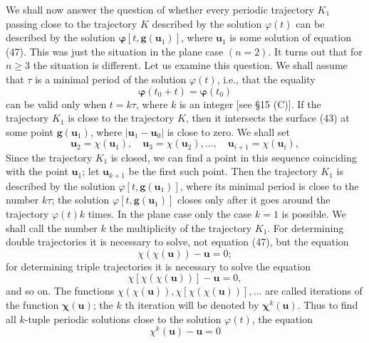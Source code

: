 \documentclass[10pt,a5paper]{book}
\theoremstyle{plain}
\theoremstyle{definition}
\theoremstyle{remark}
\begin{document}
We shall now answer the question of whether every periodic trajectory $K_{1}$ passing close to the trajectory $K$ described by the solution $\varphi(t)$ can be described by the solution $\boldsymbol{\varphi}\left[t, \mathbf{g}\left(\mathbf{u}_{1}\right)\right]$, where $\mathbf{u}_{1}$ is some solution of equation (47). This was just the situation in the plane case $(n=2)$. It turns
out that for $n \geq 3$ the situation is different. Let us examine this question. We shall assume that $\tau$ is a minimal period of the solution $\varphi(t)$, i.e., that the equality
\[
\boldsymbol{\varphi}\left(t_{0}+t\right)=\boldsymbol{\varphi}\left(t_{0}\right)
\]
can be valid only when $t=k \tau$, where $k$ is an integer [see §15 (C)]. If the trajectory $K_{1}$ is close to the trajectory $K$, then it intersects the surface (43) at some point $\mathbf{g}\left(\mathbf{u}_{1}\right)$, where $\left|\mathbf{u}_{1}-\mathbf{u}_{0}\right|$ is close to zero. We shall set
\[
\mathbf{u}_{2}=\chi\left(\mathbf{u}_{1}\right), \quad \mathbf{u}_{3}=\chi\left(\mathbf{u}_{2}\right), \ldots, \quad \mathbf{u}_{i+1}=\chi\left(\mathbf{u}_{i}\right),
\]
Since the trajectory $K_{1}$ is closed, we can find a point in this sequence coinciding with the point $\mathbf{u}_{1}$; let $\mathbf{u}_{k+1}$ be the first such point. Then the trajectory $K_{1}$ is described by the solution $\varphi\left[t, \mathbf{g}\left(\mathbf{u}_{1}\right)\right]$, where its minimal period is close to the number $k \tau$; the solution $\varphi\left[t, \mathbf{g}\left(\mathbf{u}_{1}\right)\right]$ closes only after it goes around the trajectory $\varphi(t) k$ times. In the plane case only the case $k=1$ is possible. We shall call the number $k$ the multiplicity of the trajectory $K_{1}$. For determining double trajectories it is necessary to solve, not equation (47), but the equation
\[
\chi(\chi(\mathbf{u}))-\mathbf{u}=0 ;
\]
for determining triple trajectories it is necessary to solve the equation
\[
\chi[\chi(\chi(\mathbf{u}))]-\mathbf{u}=0,
\]
and so on. The functions $\chi(\chi(\mathbf{u})), \chi[\chi(\chi(\mathbf{u}))], \ldots$ are called iterations of the function $\boldsymbol{\chi}(\mathbf{u})$; the $k$ th iteration will be denoted by $\boldsymbol{\chi}^{k}(\mathbf{u})$. Thus to find all $k$-tuple periodic solutions close to the solution $\varphi(t)$, the equation
\begin{equation*}
\chi^{k}(\mathbf{u})-\mathbf{u}=0 \tag{48}
\end{equation*}
\end{document}
